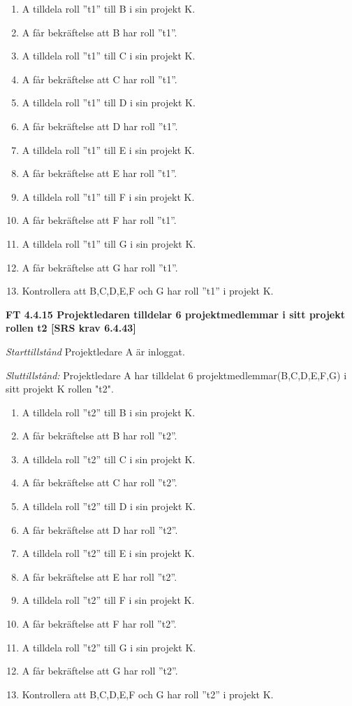 \documentclass[a4paper]{article}
\begin{document}
\begin{enumerate}
\item A tilldela roll ”t1” till B i sin projekt K. 
\item A får bekräftelse att B har roll ”t1”.
\item A tilldela roll ”t1” till C i sin projekt K. 
\item A får bekräftelse att C har roll ”t1”.
\item A tilldela roll ”t1” till D i sin projekt K.
\item A får bekräftelse att D har roll ”t1”.
\item A tilldela roll ”t1” till E i sin projekt K. 
\item A får bekräftelse att E har roll ”t1”.
\item A tilldela roll ”t1” till F i sin projekt K. 
\item A får bekräftelse att F har roll ”t1”.
\item A tilldela roll ”t1” till G i sin projekt K. 
\item A får bekräftelse att G har roll ”t1”.
\item Kontrollera att B,C,D,E,F och G har roll ”t1” i projekt K.
\end{enumerate}
\textbf{FT 4.4.15 Projektledaren tilldelar 6 projektmedlemmar i sitt projekt rollen t2 [SRS krav 6.4.43]}

\emph{Starttillstånd} Projektledare A är inloggat.

\emph{Sluttillstånd:} Projektledare A  har tilldelat 6 projektmedlemmar(B,C,D,E,F,G) i sitt projekt K rollen "t2".

\begin{enumerate}
\item A tilldela roll ”t2” till B i sin projekt K. 
\item A får bekräftelse att B har roll ”t2”.
\item A tilldela roll ”t2” till C i sin projekt K. 
\item A får bekräftelse att C har roll ”t2”.
\item A tilldela roll ”t2” till D i sin projekt K. 
\item A får bekräftelse att D har roll ”t2”.
\item A tilldela roll ”t2” till E i sin projekt K. 
\item A får bekräftelse att  E har roll ”t2”.
\item A tilldela roll ”t2” till  F i sin projekt K. 
\item A får bekräftelse att  F har roll ”t2”.
\item A tilldela roll ”t2” till G i sin projekt K. 
\item A får bekräftelse att G har roll ”t2”.
\item Kontrollera att B,C,D,E,F och G har roll ”t2” i projekt K.
\end{enumerate}
\end{document}
